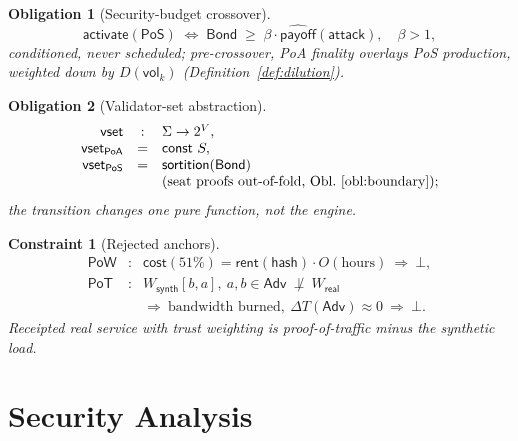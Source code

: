 \documentclass[11pt,letterpaper]{article}
\newtheorem{constraint}{Constraint}
\newtheorem{obligation}{Obligation}
\begin{document}
\begin{obligation}[Security-budget crossover]\label{obl:crossover}
\[
\mathsf{activate}(\mathsf{PoS})
\;\iff\;
\mathsf{Bond}\;\geq\;\beta\cdot
  \widehat{\mathsf{payoff}}(\mathsf{attack}),\quad\beta>1,
\]
conditioned, never scheduled; pre-crossover, PoA finality overlays PoS
production, weighted down by $D(\mathsf{vol}_k)$
(Definition~\ref{def:dilution}).
\end{obligation}

\begin{obligation}[Validator-set abstraction]\label{obl:vset}
\[
\begin{array}{rcl}
\mathsf{vset}&:&\Sigma\to2^{V},\\
\mathsf{vset}_{\mathsf{PoA}}&=&\mathsf{const}\ S,\\
\mathsf{vset}_{\mathsf{PoS}}&=&\mathsf{sortition}(\mathsf{Bond})\\
&&\text{(seat proofs out-of-fold,
  Obl.~\ref{obl:boundary})};
\end{array}
\]
the transition changes one pure function, not the engine.
\end{obligation}

\begin{constraint}[Rejected anchors]\label{con:anchors}
\[
\begin{array}{rcl}
\mathsf{PoW}&:&
  \mathsf{cost}(\text{51\%})=\mathsf{rent}(\mathsf{hash})\cdot
  O(\text{hours})\ \Rightarrow\ \bot,\\
\mathsf{PoT}&:&
  W_{\mathsf{synth}}[b,a],\ a,b\in\mathsf{Adv}\
  \not\perp\ W_{\mathsf{real}}\\
&&\Rightarrow\ \text{bandwidth burned},\
  \Delta T(\mathsf{Adv})\approx0\ \Rightarrow\ \bot.
\end{array}
\]
Receipted real service with trust weighting is proof-of-traffic minus the
synthetic load.
\end{constraint}

\section{Security Analysis}\label{sec:security}
\end{document}
